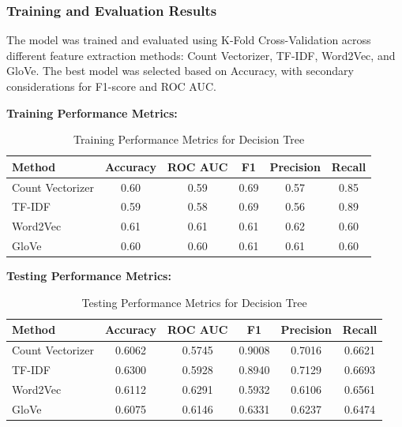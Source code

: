\subsubsection{Training and Evaluation Results}

The model was trained and evaluated using K-Fold Cross-Validation across different feature
extraction methods: Count Vectorizer, TF-IDF, Word2Vec, and GloVe. The best model was
selected based on Accuracy, with secondary considerations for F1-score and ROC AUC.

\textbf{Training Performance Metrics:}

\begin{table}[H]
    \centering
    \caption{Training Performance Metrics for Decision Tree}
    \label{tab:lr-training-metrics}
    \begin{tabular}{|l|c|c|c|c|c|}
        \hline
        \textbf{Method} & \textbf{Accuracy} & \textbf{ROC AUC} & \textbf{F1} & \textbf{Precision} & \textbf{Recall} \\ 
        \hline
        Count Vectorizer & 0.60 & 0.59 & 0.69 & 0.57 & 0.85 \\ 
        \hline
        TF-IDF & 0.59 & 0.58 & 0.69 & 0.56 & 0.89 \\ 
        \hline
        Word2Vec & 0.61 & 0.61 & 0.61 & 0.62 & 0.60 \\ 
        \hline
        GloVe & 0.60 & 0.60 & 0.61 & 0.61 & 0.60 \\ 
        \hline
    \end{tabular}
\end{table}

\textbf{Testing Performance Metrics:}

\begin{table}[H]
    \centering
    \caption{Testing Performance Metrics for Decision Tree}
    \label{tab:lr-testing-metrics}
    \begin{tabular}{|l|c|c|c|c|c|}
        \hline
        \textbf{Method} & \textbf{Accuracy} & \textbf{ROC AUC} & \textbf{F1} & \textbf{Precision} & \textbf{Recall} \\ 
        \hline
        Count Vectorizer & 0.6062 & 0.5745 & 0.9008 & 0.7016 & 0.6621 \\ 
        \hline
        TF-IDF & 0.6300 & 0.5928 & 0.8940 & 0.7129 & 0.6693 \\ 
        \hline
        Word2Vec & 0.6112 & 0.6291 & 0.5932 & 0.6106 & 0.6561 \\ 
        \hline
        GloVe & 0.6075 & 0.6146 & 0.6331 & 0.6237 & 0.6474 \\ 
        \hline
    \end{tabular}
\end{table}

